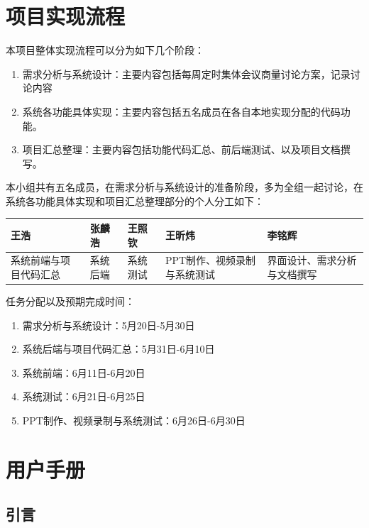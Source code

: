 \documentclass[UTF8,a4paper,10pt]{ctexart}
\begin{document}
\section{项目实现流程}
本项目整体实现流程可以分为如下几个阶段：

\begin{enumerate}
    \item 需求分析与系统设计：主要内容包括每周定时集体会议商量讨论方案，记录讨论内容
    \item 系统各功能具体实现：主要内容包括五名成员在各自本地实现分配的代码功能。
    \item 项目汇总整理：主要内容包括功能代码汇总、前后端测试、以及项目文档撰写。
\end{enumerate}

本小组共有五名成员，在需求分析与系统设计的准备阶段，多为全组一起讨论，在系统各功能具体实现和项目汇总整理部分的个人分工如下：


\begin{tabular}{|>{\centering\arraybackslash}p{2.5cm}|>{\centering\arraybackslash}p{2.5cm}|>{\centering\arraybackslash}p{2.5cm}|>{\centering\arraybackslash}p{2.5cm}|>{\centering\arraybackslash}p{2.5cm}|}
\hline
\textbf{王浩} & \textbf{张麟浩} & \textbf{王照钦} & \textbf{王昕炜} & \textbf{李铭辉} \\
\hline
系统前端与项目代码汇总 & 系统后端 & 系统测试 & PPT制作、视频录制与系统测试 & 界面设计、需求分析与文档撰写 \\
\hline
\end{tabular}

任务分配以及预期完成时间：
\begin{enumerate}
    \item 需求分析与系统设计：5月20日-5月30日
    \item 系统后端与项目代码汇总：5月31日-6月10日
    \item 系统前端：6月11日-6月20日
    \item 系统测试：6月21日-6月25日
    \item PPT制作、视频录制与系统测试：6月26日-6月30日
\end{enumerate}

\section{用户手册}

\subsection{引言}
\end{document}
